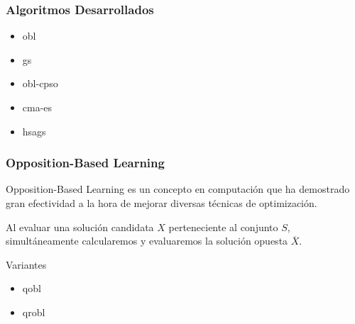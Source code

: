 \begin{frame}

\frametitle{Algoritmos Desarrollados}
\begin{block}{}
\begin{itemize}
	\item\gls{obl}
	\item\gls{gs}
\end{itemize}
\end{block}

\begin{block}{}
\begin{itemize}
	\Fontvii
	\item\gls{obl-cpso}
	\Fontvi
	\item\gls{cma-es}
	\Fontvi
	\item\gls{hsags}
	\end{itemize}
\end{block}

\end{frame}

\begin{frame}
\frametitle{Opposition-Based Learning}
\begin{block}{}
Opposition-Based Learning es un concepto en computación que ha demostrado gran efectividad a la hora de mejorar diversas técnicas de optimización.
\end{block}
\begin{block}{}
Al evaluar una solución candidata $X$ perteneciente al conjunto $S$, simultáneamente calcularemos y evaluaremos la solución opuesta $\overline{X}$.
\end{block}
\begin{block}{Variantes \cite{Segredo2017}}
\begin{itemize}
	\item\gls{qobl}
	\item\gls{qrobl}
	\end{itemize}
\end{block}
\end{frame}

